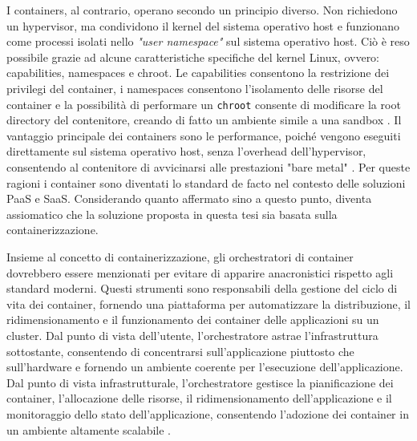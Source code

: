 \noindent I containers, al contrario, operano secondo un principio diverso. Non
richiedono un hypervisor, ma condividono il kernel del sistema operativo host e
funzionano come processi isolati nello \textit{"user namespace"} sul sistema operativo
host. Ciò è reso possibile grazie ad alcune caratteristiche specifiche del
kernel Linux, ovvero: capabilities, namespaces e chroot.
Le capabilities consentono la restrizione dei privilegi del container, i
namespaces consentono l'isolamento delle risorse del container e la possibilità
di performare un \texttt{chroot} consente di modificare la root directory del
contenitore, creando di fatto un ambiente simile a una sandbox \cite{kerris2021,
  deochake2023}.
Il vantaggio principale dei containers sono le performance, poiché vengono eseguiti direttamente
sul sistema operativo host, senza l'overhead dell'hypervisor, consentendo al contenitore di avvicinarsi
alle prestazioni "bare metal" \cite{deochake2023}.
Per queste ragioni i container sono diventati lo standard de facto nel contesto delle soluzioni PaaS
e SaaS.
Considerando quanto affermato sino a questo punto, diventa assiomatico che la
soluzione proposta in questa tesi sia basata sulla containerizzazione.

Insieme al concetto di containerizzazione, gli orchestratori di container
dovrebbero essere menzionati per evitare di apparire anacronistici rispetto agli
standard moderni.
Questi strumenti sono responsabili della gestione del ciclo di vita dei
container, fornendo una piattaforma per automatizzare la distribuzione, il
ridimensionamento e il funzionamento dei container delle applicazioni su  un cluster.
Dal punto di vista dell'utente, l'orchestratore astrae l'infrastruttura
sottostante, consentendo di concentrarsi sull'applicazione piuttosto che
sull'hardware e fornendo un ambiente coerente per l'esecuzione
dell'applicazione.
Dal punto di vista infrastrutturale, l'orchestratore
gestisce la pianificazione dei container, l'allocazione delle risorse, il
ridimensionamento dell'applicazione e il monitoraggio dello stato
dell'applicazione, consentendo l'adozione dei container in un ambiente altamente
scalabile \cite{bookofkubernetes}.


